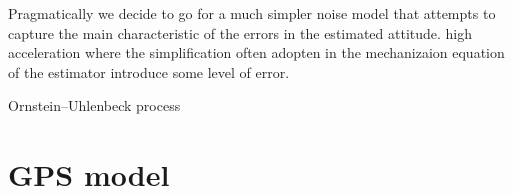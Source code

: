 \documentclass[a4paper,11pt]{report}
\begin{document}
Pragmatically we decide to go for a much simpler noise model that attempts to capture the main characteristic of the errors in the estimated attitude. 
high acceleration where the simplification often adopten in the mechanizaion equation of the estimator introduce some level of error. 

Ornstein–Uhlenbeck process

\section{GPS model}
\end{document}
